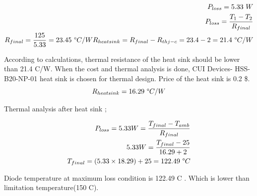 \begin{align}
    P_{loss} = 5.33\ W \\
    P_{loss} = \frac{T_1 - T_2 }{R_{final}}\\
    R_{final} = \frac{125}{5.33} = 23.45\ \degree C/W
    R_{heat sink} = R_{final} - R_{thj-c} = 23.4-2 = 21.4\ \degree C/W\\
\end{align}

According to calculations, thermal resistance of the heat sink should be lower than 21.4 \degree C/W. When the cost and thermal analysis is done, CUI Devices- HSS-B20-NP-01 heat sink is chosen for thermal design. Price of the heat sink is 0.2 \$. 
$$R_{heat sink} = 16.29\ \degree C/W $$

Thermal analysis after heat sink ;

\begin{align}
    P_{loss} = 5.33 W = \frac{T_{final}-T_{amb}}{R_{final}}\\
    5.33 W = \frac{T_{final}-25}{16.29+2} \\
    T_{final} = (5.33 \times 18.29 ) + 25 = 122.49\ \degree C 
\end{align}

Diode temperature at maximum loss condition is 122.49 \degree C . Which is lower than limitation temperature(150 \degree C).

\newpage